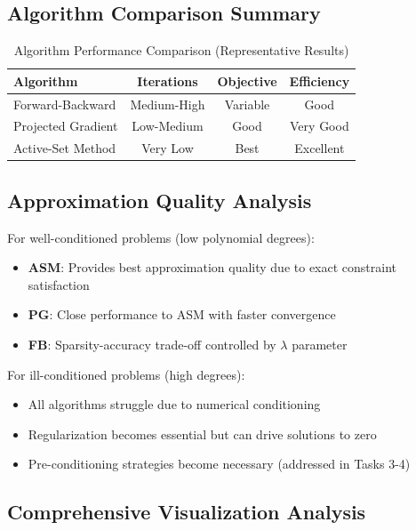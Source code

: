 \documentclass[11pt,a4paper]{article}
\begin{document}
\subsection{Algorithm Comparison Summary}

\begin{table}[h]
\centering
\caption{Algorithm Performance Comparison (Representative Results)}
\begin{tabular}{lccc}
\toprule
\textbf{Algorithm} & \textbf{Iterations} & \textbf{Objective} & \textbf{Efficiency} \\
\midrule
Forward-Backward & Medium-High & Variable & Good \\
Projected Gradient & Low-Medium & Good & Very Good \\
Active-Set Method & Very Low & Best & Excellent \\
\bottomrule
\end{tabular}
\end{table}

\subsection{Approximation Quality Analysis}

For well-conditioned problems (low polynomial degrees):
\begin{itemize}
    \item \textbf{ASM}: Provides best approximation quality due to exact constraint satisfaction
    \item \textbf{PG}: Close performance to ASM with faster convergence
    \item \textbf{FB}: Sparsity-accuracy trade-off controlled by $\lambda$ parameter
\end{itemize}

For ill-conditioned problems (high degrees):
\begin{itemize}
    \item All algorithms struggle due to numerical conditioning
    \item Regularization becomes essential but can drive solutions to zero
    \item Pre-conditioning strategies become necessary (addressed in Tasks 3-4)
\end{itemize}

\subsection{Comprehensive Visualization Analysis}
\end{document}
